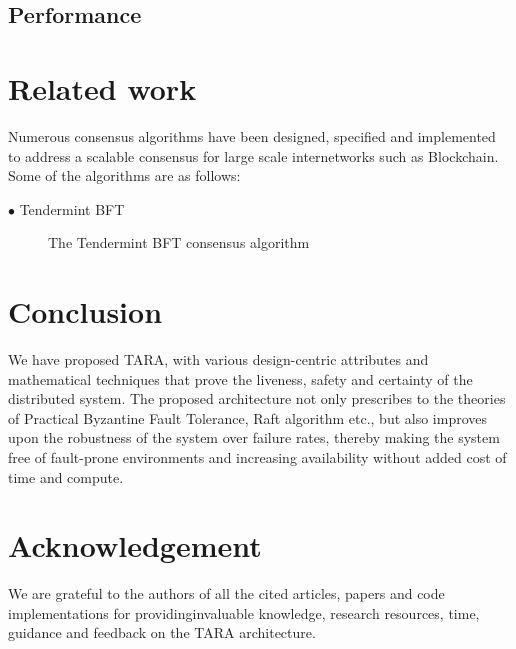 \documentclass[]{article}
\begin{document}
\subsection{Performance}

\section{Related work}
Numerous consensus algorithms have been designed, specified and implemented to address a scalable consensus for large scale internetworks such as Blockchain. Some of the algorithms are as follows:
\begin{description}
	\item[$\bullet$ Tendermint BFT] The Tendermint BFT consensus algorithm
\end{description}

\section{Conclusion}
We have proposed TARA, with various design-centric attributes and mathematical techniques that prove the liveness, safety and certainty of the distributed system. The proposed architecture not only prescribes to the theories of Practical Byzantine Fault Tolerance, Raft algorithm etc., but also improves upon the robustness of the system over failure rates, thereby making the system free of fault-prone environments and increasing availability without added cost of time and compute.

\section{Acknowledgement}
We are grateful to the authors of all the cited articles, papers and code implementations for providinginvaluable knowledge, research resources, time, guidance and feedback on the TARA architecture.

 

\end{document}
